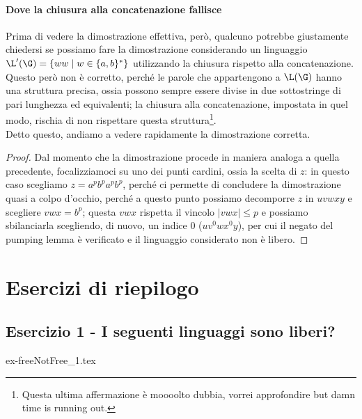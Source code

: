 \documentclass[class=book, crop=false, oneside, 12pt]{standalone}
\begin{document}
  \paragraph{Dove la chiusura alla concatenazione fallisce}
  Prima di vedere la dimostrazione effettiva, però, qualcuno potrebbe giustamente chiedersi se possiamo fare la dimostrazione considerando un linguaggio \(\L'(\G) = \{ww \mid w\in\{a,b\}^*\}\) utilizzando la chiusura rispetto alla concatenazione. Questo però non è corretto, perché le parole che appartengono a \(\L(\G)\) hanno una struttura precisa, ossia possono sempre essere divise in due sottostringe di pari lunghezza ed equivalenti; la chiusura alla concatenazione, impostata in quel modo, rischia di non rispettare questa struttura\footnote{Questa ultima affermazione è moooolto dubbia, vorrei approfondire but damn time is running out.}. \\
  Detto questo, andiamo a vedere rapidamente la dimostrazione corretta.
  \begin{proof}
    Dal momento che la dimostrazione procede in maniera analoga a quella precedente, focalizziamoci su uno dei punti cardini, ossia la scelta di \(z\): in questo caso scegliamo \(z=a^pb^pa^pb^p\), perché ci permette di concludere la dimostrazione quasi a colpo d'occhio, perché a questo punto possiamo decomporre \(z\) in \(uvwxy\) e scegliere \(vwx = b^p\); questa \(vwx\) rispetta il vincolo \(|vwx| \le p\) e possiamo sbilanciarla scegliendo, di nuovo, un indice 0 (\(uv^0wx^0y\)), per cui il negato del pumping lemma è verificato e il linguaggio considerato non è libero.
  \end{proof}
  
\section{Esercizi di riepilogo}
\subsection*{Esercizio 1 - I seguenti linguaggi sono liberi?}

\begin{table}[H]
	\centering
	{ex-freeNotFree_1.tex}
    \caption{Esercizio 1}
    \label{tab:ex-freeNotFree_1}
\end{table}
\end{document}
